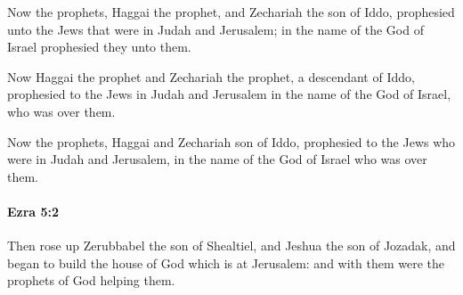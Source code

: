 			\begin{versebox}
					\item[BHS] 
					\item[LXX] 
					\item[ASV] Now the prophets, Haggai the prophet, and Zechariah the son of Iddo, prophesied unto the Jews that were in Judah and Jerusalem; in the name of the God of Israel prophesied they unto them.
					\item[NIV] Now Haggai the prophet and Zechariah the prophet, a descendant of Iddo, prophesied to the Jews in Judah and Jerusalem in the name of the God of Israel, who was over them.
					\item[NRSV] Now the prophets, Haggai and Zechariah son of Iddo, prophesied to the Jews who were in Judah and Jerusalem, in the name of the God of Israel who was over them.
			\end{versebox}

		\paragraph{Ezra 5:2} %
			\label{EZRA-5-2}

			Then rose up Zerubbabel the son of Shealtiel, and Jeshua the son of Jozadak, and began to build the house of God which is at Jerusalem: and with them were the prophets of God helping them.

